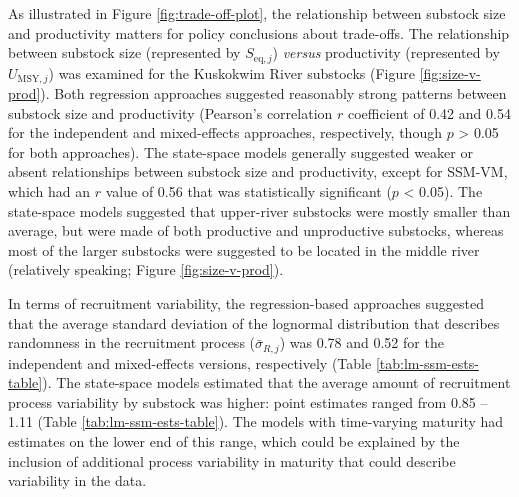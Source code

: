 \documentclass[12pt,]{book}
\theoremstyle{definition}
\theoremstyle{definition}
\theoremstyle{definition}
\theoremstyle{remark}
\begin{document}
As illustrated in Figure \ref{fig:trade-off-plot}, the relationship
between substock size and productivity matters for policy conclusions
about trade-offs. The relationship between substock size (represented by
\(S_{\text{eq},j}\)) \emph{versus} productivity (represented by
\(U_{\text{MSY},j}\)) was examined for the Kuskokwim River substocks
(Figure \ref{fig:size-v-prod}). Both regression approaches suggested
reasonably strong patterns between substock size and productivity
(Pearson's correlation \(r\) coefficient of 0.42 and 0.54 for the
independent and mixed-effects approaches, respectively, though \(p\)
\textgreater{} 0.05 for both approaches). The state-space models
generally suggested weaker or absent relationships between substock size
and productivity, except for SSM-VM, which had an \(r\) value of 0.56
that was statistically significant (\(p\) \textless{} 0.05). The
state-space models suggested that upper-river substocks were mostly
smaller than average, but were made of both productive and unproductive
substocks, whereas most of the larger substocks were suggested to be
located in the middle river (relatively speaking; Figure
\ref{fig:size-v-prod}).

In terms of recruitment variability, the regression-based approaches
suggested that the average standard deviation of the lognormal
distribution that describes randomness in the recruitment process
(\(\bar{\sigma}_{R,j}\)) was 0.78 and 0.52 for the independent and
mixed-effects versions, respectively (Table
\ref{tab:lm-ssm-ests-table}). The state-space models estimated that the
average amount of recruitment process variability by substock was
higher: point estimates ranged from 0.85 -- 1.11 (Table
\ref{tab:lm-ssm-ests-table}). The models with time-varying maturity had
estimates on the lower end of this range, which could be explained by
the inclusion of additional process variability in maturity that could
describe variability in the data.
\end{document}

